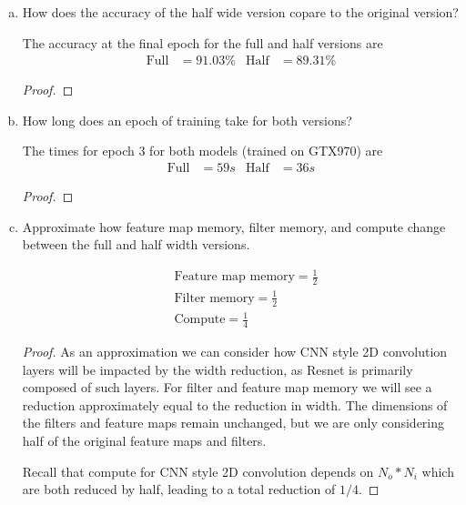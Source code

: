 \documentclass[11pt]{article}
\begin{document}
\begin{enumerate}[(a)]
	\item How does the accuracy of the half wide version copare to the original
		version?
	\begin{solution}
		The accuracy at the final epoch for the full and half versions are
		\begin{align}
			\text{Full} &= 91.03\%
			&
			\text{Half} &= 89.31\%
		\end{align}
	\end{solution}
	\begin{proof}
	\end{proof}

	\item How long does an epoch of training take for both versions?
	\begin{solution}
		The times for epoch $3$ for both models (trained on GTX970) are
		\begin{align}
			\text{Full} &= 59s
			&
			\text{Half} &= 36s
		\end{align}
	\end{solution}
	\begin{proof}
	\end{proof}

	\item Approximate how feature map memory, filter memory, and compute change
		between the full and half width versions.
	\begin{solution}

		\begin{align}
			&\text{Feature map memory} = \frac{1}{2}
			\\
			&\text{Filter memory} = \frac{1}{2}
			\\
			&\text{Compute} = \frac{1}{4}
		\end{align}
	\end{solution}
	\begin{proof}
		As an approximation we can consider how CNN style 2D convolution layers
		will be impacted by the width reduction, as Resnet is primarily
		composed of such layers. For filter and feature map memory we will see
		a reduction approximately equal to the reduction in width. The
		dimensions of the filters and feature maps remain unchanged, but we are
		only considering half of the original feature maps and filters.
		\newline

		Recall that compute for CNN style 2D convolution depends on $N_o * N_i$
		which are both reduced by half, leading to a total reduction of $1/4$.
	\end{proof}

\end{enumerate}
\end{document}
